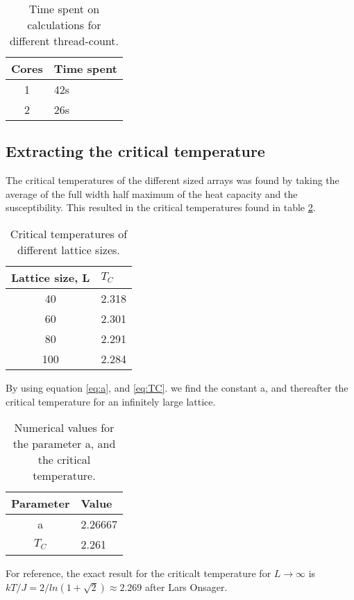 \documentclass[../main.tex]{subfiles}
\begin{document}
\begin{table}[!h]
  \begin{center}
    \begin{tabular}{|c| l|}
      \hline
      Cores & Time spent\\
      \hline
      1 & 42s\\
      2 & 26s\\
      \hline
    \end{tabular}
    \caption{Time spent on calculations for different thread-count.}
    \label{tab:results-MPI}
  \end{center}
\end{table}
\FloatBarrier


\subsection{Extracting the critical temperature}
The critical temperatures of the different sized arrays was found by taking the average of the full width half maximum of the heat capacity and the susceptibility. This resulted in the critical temperatures found in table \ref{tab:results-TC-lattices}.
\begin{table}[!h]
  \begin{center}
    \begin{tabular}{|c| l|}
      \hline
      Lattice size, L & $T_C$ \\
      \hline
      40 & 2.318\\
      60 & 2.301\\
      80 & 2.291\\
      100 & 2.284\\
      \hline
    \end{tabular}
    \caption{Critical temperatures of different lattice sizes.}
    \label{tab:results-TC-lattices}
  \end{center}
\end{table}
\FloatBarrier
By using equation \eqref{eq:a}, and \eqref{eq:TC}. we find the constant a, and thereafter the critical temperature for an infinitely large lattice.

\begin{table}[!h]
  \begin{center}
    \begin{tabular}{|c| l|}
      \hline
      Parameter & Value \\
      \hline
      a & 2.26667\\
      $T_C$ & 2.261\\
      \hline
    \end{tabular}
    \caption{Numerical values for the parameter a, and the critical temperature.}
    \label{tab:results-a-and-TC}
  \end{center}
\end{table}
\FloatBarrier

For reference, the exact result for the criticalt temperature for $L \rightarrow \infty$ is $kT/J = 2/ln(1 +\sqrt{2}) \approx 2.269$ after Lars Onsager.\cite{larsonsager}
\end{document}
